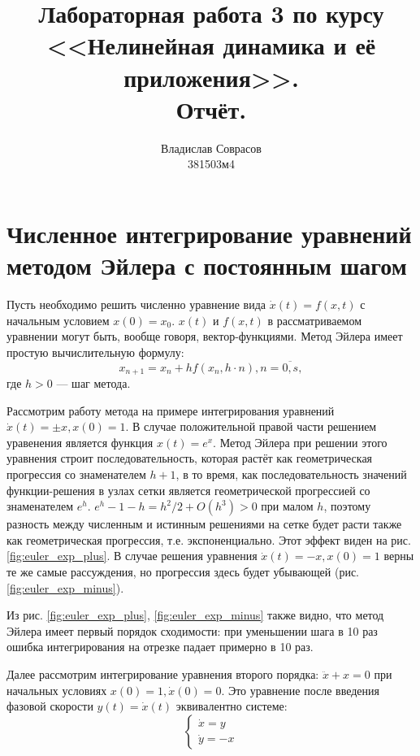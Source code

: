 \documentclass[a4paper]{article}
\begin{document}
\title{Лабораторная работа 3 по курсу <<Нелинейная динамика и её приложения>>. \\Отчёт.}
\author{Владислав Соврасов\\ 381503м4}
\date{}
\maketitle

\section{Численное интегрирование уравнений методом Эйлера с постоянным шагом}
Пусть необходимо решить численно уравнение вида \(\dot x(t)=f(x,t)\) с начальным
условием \(x(0)=x_0\). \(x(t)\) и \(f(x,t)\) в рассматриваемом уравнении могут быть,
вообще говоря, вектор-функциями. Метод Эйлера имеет простую вычислительную формулу:
\begin{displaymath}
	x_{n+1}=x_n+hf(x_n, h\cdot n),n=\overline{0,s},
\end{displaymath}
где \(h>0\) --- шаг метода.

Рассмотрим работу метода на примере интегрирования уравнений \(\dot x(t) = \pm x, x(0)=1\).
В случае положительной правой части решением уравенения является функция \(x(t)=e^x\).
Метод Эйлера при решении этого уравнения строит последовательность, которая растёт
как геометрическая прогрессия со знаменателем \(h+1\), в то время, как
последовательность значений функции-решения в узлах сетки является
геометрической прогрессией со знаменателем \(e^h\). \(e^h - 1 - h = h^2/2 + O(h^3)>0\)
при малом \(h\), поэтому разность между численным и истинным решениями на сетке
будет расти также как геометрическая прогрессия, т.е. экспоненциально. Этот эффект
виден на рис. \ref{fig:euler_exp_plus}.
В случае решения уравнения \(\dot x(t) = - x, x(0)=1\) верны те же самые рассуждения,
но прогрессия здесь будет убывающей (рис. \ref{fig:euler_exp_minus}).

Из рис. \ref{fig:euler_exp_plus}, \ref{fig:euler_exp_minus} также видно, что метод
Эйлера имеет первый порядок сходимости: при уменьшении шага в 10 раз ошибка интегрирования
на отрезке падает примерно в 10 раз.

Далее рассмотрим интегрирование уравнения второго порядка: \(\ddot x + x=0\) при
начальных условиях \(x(0)=1,\dot x(0)=0\). Это уравнение после введения фазовой скорости
\(y(t)=\dot x(t)\) эквивалентно системе:
\begin{displaymath}
	\left\{
  \begin{array}{lr}
    \dot x = y\\
    \dot y = -x
  \end{array}
\right.
\end{displaymath}
\end{document}
